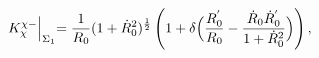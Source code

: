 \begin{equation}
K^{\chi -}_{\chi}\Bigl|_{\Sigma_{1}}=\frac{1}{R_{0}}
(1+\dot{R}_{0}^2)^{\frac{1}{2}}\left(1+\delta\Bigl(\frac{R^{'}_{0}}
{R_{0}}-\frac{\dot{R}_{0}\dot{R}^{'}_{0}}{1+\dot{R}_{0}^2}\Bigr)\right),
\end{equation}

